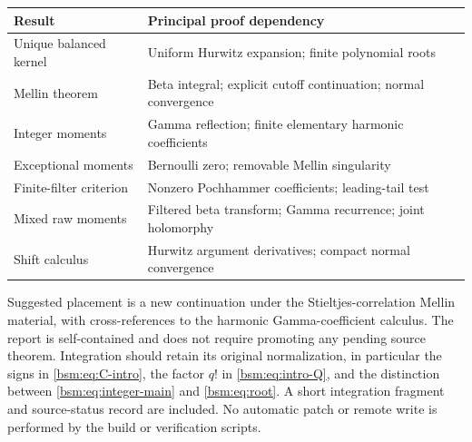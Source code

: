 \documentclass[11pt,letterpaper]{article}
\numberwithin{equation}{section}
\theoremstyle{definition}\newtheorem{definition}[theorem]{Definition}
\theoremstyle{remark}\newtheorem{remark}[theorem]{Remark}
\begin{document}
\begin{center}
\begin{tabular}{p{}p{}}
\toprule
Result & Principal proof dependency\\
\midrule
Unique balanced kernel & Uniform Hurwitz expansion; finite polynomial roots\\
Mellin theorem & Beta integral; explicit cutoff continuation; normal convergence\\
Integer moments & Gamma reflection; finite elementary harmonic coefficients\\
Exceptional moments & Bernoulli zero; removable Mellin singularity\\
Finite-filter criterion & Nonzero Pochhammer coefficients; leading-tail test\\
Mixed raw moments & Filtered beta transform; Gamma recurrence; joint holomorphy\\
Shift calculus & Hurwitz argument derivatives; compact normal convergence\\
\bottomrule
\end{tabular}
\end{center}

Suggested placement is a new continuation under the Stieltjes-correlation
Mellin material, with cross-references to the harmonic Gamma-coefficient
calculus. The report is self-contained and does not require promoting
any pending source theorem. Integration should retain its original
normalization, in particular the signs in \eqref{bsm:eq:C-intro}, the
factor $q!$ in \eqref{bsm:eq:intro-Q}, and the distinction between
\eqref{bsm:eq:integer-main} and \eqref{bsm:eq:root}. A short integration
fragment and source-status record are included. No automatic patch
or remote write is performed by the build or verification scripts.
\end{document}
